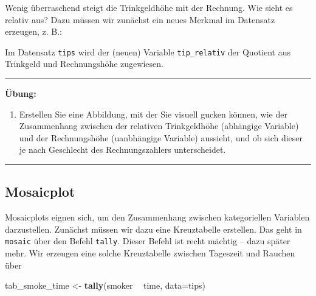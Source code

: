 \documentclass[12pt,ngerman,paper=a4,pagesize,DIV=13]{scrreprt}
\newenvironment{Shaded}{\begin{snugshade}}{\end{snugshade}}
\newcommand{\DataTypeTok}[1]{\textcolor[rgb]{0.13,0.29,0.53}{#1}}
\newcommand{\KeywordTok}[1]{\textcolor[rgb]{0.13,0.29,0.53}{\textbf{#1}}}
\newcommand{\NormalTok}[1]{#1}
\newcommand{\OperatorTok}[1]{\textcolor[rgb]{0.81,0.36,0.00}{\textbf{#1}}}
\newcommand{\StringTok}[1]{\textcolor[rgb]{0.31,0.60,0.02}{#1}}
\providecommand{\tightlist}{%
  \setlength{\itemsep}{0pt}\setlength{\parskip}{0pt}}
\begin{document}
Wenig überraschend steigt die Trinkgeldhöhe mit der Rechnung. Wie sieht
es relativ aus? Dazu müssen wir zunächst ein neues Merkmal im Datensatz
erzeugen, z. B.:

\begin{Shaded}
\end{Shaded}

Im Datensatz \texttt{tips} wird der (neuen) Variable
\texttt{tip\_relativ} der Quotient aus Trinkgeld und Rechnungshöhe
zugewiesen.

\begin{center}\rule{0.5\linewidth}{\linethickness}\end{center}

\textbf{Übung:}

\begin{enumerate}
\def\labelenumi{\arabic{enumi}.}
\setcounter{enumi}{3}
\tightlist
\item
  Erstellen Sie eine Abbildung, mit der Sie visuell gucken können, wie
  der Zusammenhang zwischen der relativen Trinkgeldhöhe (abhängige
  Variable) und der Rechnungshöhe (uanbhängige Variable) aussieht, und
  ob sich dieser je nach Geschlecht des Rechnungszahlers unterscheidet.
\end{enumerate}

\begin{center}\rule{0.5\linewidth}{\linethickness}\end{center}

\hypertarget{mosaicplot}{%
\subsection{Mosaicplot}\label{mosaicplot}}

Mosaicplots eignen sich, um den Zusammenhang zwischen kategoriellen
Variablen darzustellen. Zunächst müssen wir dazu eine Kreuztabelle
erstellen. Das geht in \texttt{mosaic} über den Befehl \texttt{tally}.
Dieser Befehl ist recht mächtig -- dazu später mehr. Wir erzeugen eine
solche Kreuztabelle zwischen Tageszeit und Rauchen über

\begin{Shaded}
\begin{Highlighting}[]
\NormalTok{tab_smoke_time <-}\StringTok{ }\KeywordTok{tally}\NormalTok{(smoker }\OperatorTok{~}\StringTok{ }\NormalTok{time, }\DataTypeTok{data=}\NormalTok{tips)}
\end{Highlighting}
\end{Shaded}
\end{document}
